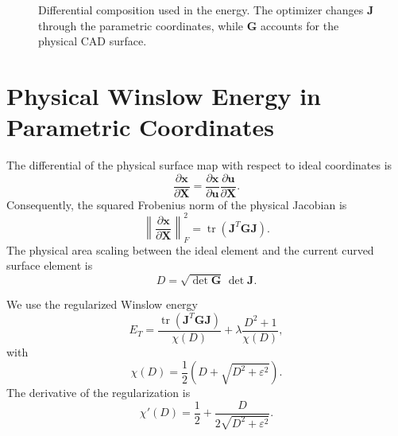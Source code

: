 \documentclass[11pt]{article}
\newcommand{\dd}{\mathrm{d}}
\newcommand{\bx}{\bm{x}}
\newcommand{\bu}{\bm{u}}
\newcommand{\bX}{\bm{X}}
\newcommand{\bG}{\bm{G}}
\newcommand{\bJ}{\bm{J}}
\begin{document}
\begin{figure}[htbp]
\centering
{}
\caption{Differential composition used in the energy. The optimizer changes
\(\bJ\) through the parametric coordinates, while \(\bG\) accounts for the
physical CAD surface.}
\label{fig:differential-composition}
\end{figure}

\section{Physical Winslow Energy in Parametric Coordinates}

The differential of the physical surface map with respect to ideal coordinates
is
\[
  \frac{\partial \bx}{\partial \bX}
  =
  \frac{\partial \bx}{\partial \bu}
  \frac{\partial \bu}{\partial \bX}.
\]
Consequently, the squared Frobenius norm of the physical Jacobian is
\[
  \left\|
    \frac{\partial \bx}{\partial \bX}
  \right\|_F^2
  =
  \operatorname{tr}\left(\bJ^T \bG \bJ\right).
\]
The physical area scaling between the ideal element and the current curved
surface element is
\[
  D =
  \sqrt{\det \bG}\,\det \bJ.
\]

We use the regularized Winslow energy
\[
  E_T =
  \frac{\operatorname{tr}\left(\bJ^T \bG \bJ\right)}
       {\chi(D)}
  +
  \lambda
  \frac{D^2 + 1}
       {\chi(D)},
\]
with
\[
  \chi(D) =
  \frac{1}{2}\left(D + \sqrt{D^2 + \varepsilon^2}\right).
\]
The derivative of the regularization is
\[
  \chi'(D) =
  \frac{1}{2}
  +
  \frac{D}{2\sqrt{D^2+\varepsilon^2}}.
\]
\end{document}
